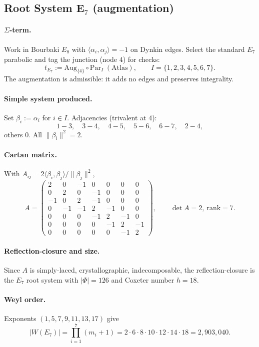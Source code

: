 \documentclass[12pt]{article}
\begin{document}
\subsection{Root System E$_7$ (augmentation)}\label{sec:e7-augmentation}

\paragraph{$\Sigma$-term.}
Work in Bourbaki $E_8$ with $\langle\alpha_i,\alpha_j\rangle=-1$ on Dynkin edges. Select the standard $E_7$ parabolic and tag the junction (node $4$) for checks:
\[
t_{E_7}:=\mathrm{Aug}_{\{4\}}\circ \mathrm{Par}_{I}\;(\text{Atlas}),\qquad
I=\{1,2,3,4,5,6,7\}.
\]
The augmentation is admissible: it adds no edges and preserves integrality.

\paragraph{Simple system produced.}
Set $\beta_i:=\alpha_i$ for $i\in I$. Adjacencies (trivalent at $4$):
\[
1\!-\!3,\quad 3\!-\!4,\quad 4\!-\!5,\quad 5\!-\!6,\quad 6\!-\!7,\quad 2\!-\!4,
\]
others $0$. All $\|\beta_i\|^2=2$.

\paragraph{Cartan matrix.}
With $A_{ij}=2\langle\beta_i,\beta_j\rangle/\|\beta_j\|^2$,
\[
A=
\begin{pmatrix}
2&0&-1&0&0&0&0\\
0&2&0&-1&0&0&0\\
-1&0&2&-1&0&0&0\\
0&-1&-1&2&-1&0&0\\
0&0&0&-1&2&-1&0\\
0&0&0&0&-1&2&-1\\
0&0&0&0&0&-1&2
\end{pmatrix},
\qquad \det A=2,\ \mathrm{rank}=7.
\]

\paragraph{Reflection-closure and size.}
Since $A$ is simply-laced, crystallographic, indecomposable, the reflection-closure is the $E_7$ root system with $|\Phi|=126$ and Coxeter number $h=18$.

\paragraph{Weyl order.}
Exponents $(1,5,7,9,11,13,17)$ give
\[
|W(E_7)|=\prod_{i=1}^7 (m_i+1)=2\cdot6\cdot8\cdot10\cdot12\cdot14\cdot18
=2{,}903{,}040.
\]
\end{document}
